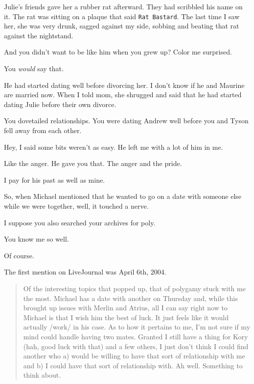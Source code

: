 \begin{paracol}{2}
\begin{leftcolumn}
Julie's friends gave her a rubber rat afterward. They had scribbled his name on it. The rat was sitting on a plaque that said \texttt{Rat\ Bastard}. The last time I saw her, she was very drunk, sagged against my side, sobbing and beating that rat against the nightstand.

\begin{ally}
And you didn't want to be like him when you grew up? Color me surprised.
\end{ally}
You \emph{would} say that.

He had started dating well before divorcing her. I don't know if he and Maurine are married now. When I told mom, she shrugged and said that he had started dating Julie before their own divorce.

\begin{ally}
You dovetailed relationships. You were dating Andrew well before you and Tyson fell away from each other.
\end{ally}
Hey, I said some bits weren't as easy. He left me with a lot of him in me.

\begin{ally}
Like the anger. He gave you that. The anger and the pride.
\end{ally}
I pay for his past as well as mine.

So, when Michael mentioned that he wanted to go on a date with someone else while we were together, well, it touched a nerve.
\newpage

\begin{ally}
I suppose you also searched your archives for poly.
\end{ally}
You know me so well.

\begin{ally}
Of course.
\end{ally}
The first mention on LiveJournal was April 6th, 2004.

\begin{quotation}
Of the interesting topics that popped up, that of polygamy stuck with me the most.  Michael has a date with another on Thursday and, while this brought up issues with Merlin and Atrius, all I can say right now to Michael is that I wish him the best of luck.  It just feels like it would actually /work/ in his case.  As to how it pertains to me, I'm not sure if my mind could handle having two mates.  Granted I still have a thing for Kory (hah, good luck with that) and a few others, I just don't think I could find another who a) would be willing to have that sort of relationship with me and b) I could have that sort of relationship with.  Ah well.  Something to think about.
\end{quotation}


\end{leftcolumn}
\end{paracol}
